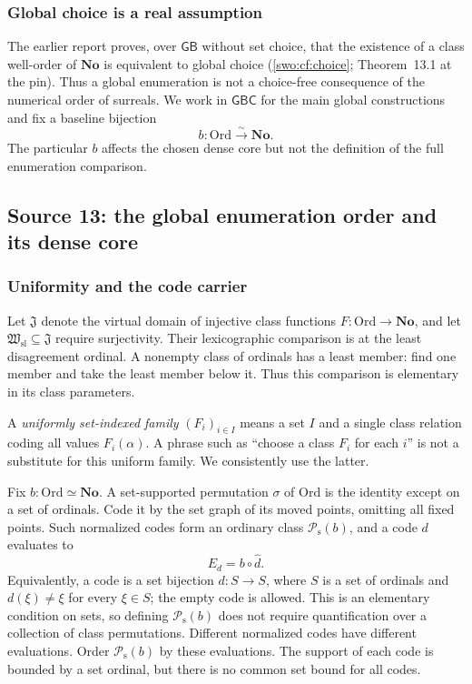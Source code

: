 \documentclass[11pt]{article}
\theoremstyle{definition}
\theoremstyle{remark}
\newcommand{\No}{\mathbf{No}}
\newcommand{\Ord}{\mathrm{Ord}}
\newcommand{\Hsl}{\mathfrak W_{\mathrm{sl}}}
\newcommand{\Jinj}{\mathfrak J}
\newcommand{\Psupp}{\mathcal P_{\mathrm{s}}}
\newcommand{\GB}{\mathsf{GB}}
\newcommand{\GBC}{\mathsf{GBC}}
\begin{document}
\subsubsection{Global choice is a real assumption}

The earlier report proves, over $\GB$ without set choice, that the
existence of a class well-order of $\No$ is equivalent to global choice
(\cref{swo:cf:choice}; Theorem~13.1 at the pin). Thus a global enumeration is not a
choice-free consequence of the numerical order of surreals. We work in
$\GBC$ for the main global constructions and fix a baseline bijection
\[
                         b:\Ord\overset{\sim}{\longrightarrow}\No.
\]
The particular $b$ affects the chosen dense core but not the definition
of the full enumeration comparison.

\subsection{Source 13: the global enumeration order and its dense core}\label{swo:fs:sec:core}

\subsubsection{Uniformity and the code carrier}

Let $\Jinj$ denote the virtual domain of injective class functions
$F:\Ord\to\No$, and let $\Hsl\subseteq \Jinj$ require surjectivity. Their
lexicographic comparison is at the least disagreement ordinal. A
nonempty class of ordinals has a least member: find one member and take
the least member below it. Thus this comparison is elementary in its
class parameters.

A \emph{uniformly set-indexed family} $(F_i)_{i\in I}$ means a set $I$
and a single class relation coding all values $F_i(\alpha)$. A phrase
such as ``choose a class $F_i$ for each $i$'' is not a substitute for this
uniform family. We consistently use the latter.

Fix $b:\Ord\simeq\No$. A set-supported permutation $\sigma$ of $\Ord$
is the identity except on a set of ordinals. Code it by the set graph of
its moved points, omitting all fixed points. Such normalized codes form
an ordinary class $\Psupp(b)$, and a code $d$ evaluates to
\[
                             E_d=b\circ\widehat d.
\]
Equivalently, a code is a set bijection $d:S\to S$, where $S$ is a
set of ordinals and $d(\xi)\ne\xi$ for every $\xi\in S$; the empty
code is allowed. This is an elementary condition on sets, so defining
$\Psupp(b)$ does not require quantification over a collection of class
permutations. Different normalized codes have different evaluations.
Order $\Psupp(b)$ by these evaluations. The support of each code is bounded by a set ordinal,
but there is no common set bound for all codes.
\end{document}
